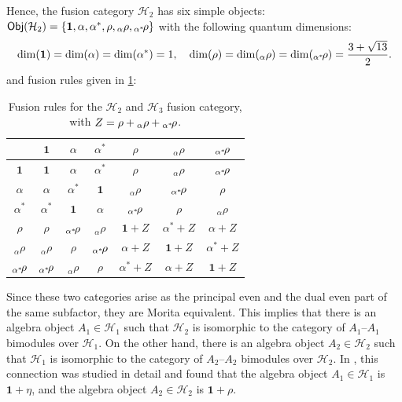 {{		Hence, the fusion category $\mathcal{H}_2$ has six simple objects: $\mathsf{Obj}(\mathcal{H}_2)=\{\mathbf{1},\alpha,\alpha^*,\rho,{}_\alpha\rho,{}_{\alpha^*}\!\rho\}$ with the following quantum dimensions:
		\begin{align}
		\dim(\mathbf{1})=\dim(\alpha)=\dim(\alpha^*)=1,\hspace{10pt}\dim(\rho)=\dim({}_\alpha\rho)=\dim({}_{\alpha^*}\!\rho)=\frac{3+\sqrt{13}}{2}.
		\end{align}
		and fusion rules given in \cref{tab:fusionH2}:
		{{\setlength{\tabcolsep}{10pt}
			\renewcommand{\arraystretch}{1.25}
			\begin{table}[H]
				\centering
				\begin{tabular}{c||c|c|c|c|c|c}
					& $\mathbf{1}$ & $\alpha$ & $\alpha^*$ & $\rho$ & ${}_\alpha
					\rho$ & ${}_{\alpha^*}\!\rho$ \\ \hline \hline
					$\mathbf{1}$ & $\mathbf{1}$ & $\alpha$ & $\alpha^*$ & $\rho$ & ${}_\alpha \rho$ & ${}_{\alpha^*}\!\rho$ \\ \hline
					$\alpha$ & $\alpha$ & $\alpha^*$ & $\mathbf{1}$ & ${}_\alpha \rho$ & ${}_{\alpha^*}\!\rho$ & $\rho$ \\ \hline
					$\alpha^*$ & $\alpha^*$ & $\mathbf{1}$ & $\alpha$ & ${}_{\alpha^*}\!\rho$ & $\rho$ & ${}_\alpha \rho$ \\ \hline
					$\rho$ & $\rho$ & ${}_{\alpha^*}\!\rho$ & ${}_\alpha \rho$ & $\mathbf{1}+ Z$ & $\alpha^*+Z$ & $\alpha+Z$ \\ \hline
					${}_\alpha\rho$ & ${}_\alpha\rho$ & $\rho$ & ${}_{\alpha^*}\!\rho$ & $\alpha+Z$ & $\mathbf{1}+Z$ & $\alpha^*+Z$ \\ \hline
					${}_{\alpha^*}\!\rho$ & ${}_{\alpha^*}\!\rho$ & ${}_\alpha\rho$ & $\rho$ & $\alpha^*+Z$ & $\alpha+Z$ & $\mathbf{1}+Z$\vspace{8pt}
				\end{tabular}
				\caption{\small \label{tab:fusionH2}Fusion rules for the $\mathcal{H}_2$ and $\mathcal{H}_3$ fusion category, with $Z=\rho+{}_\alpha\rho+{}_{\alpha^*}\!\rho$.}
			\end{table}}
			
			Since these two categories arise as the principal even and the dual even part of the same subfactor, they are Morita equivalent. This implies that there is an algebra object $A_1\in\mathcal{H}_1$ such that $\mathcal{H}_2$ is isomorphic to the category of $A_1$--$A_1$ bimodules over $\mathcal{H}_1$. On the other hand, there is an algebra object $A_2\in\mathcal{H}_2$ such that $\mathcal{H}_1$ is isomorphic to the category of $A_2$--$A_2$ bimodules over $\mathcal{H}_2$. In \cite{grossman_quantum_2012}, this connection was studied in detail and found that the algebra object $A_1\in\mathcal{H}_1$ is $\mathbf{1}+\eta$, and the algebra object $A_2\in\mathcal{H}_2$ is $\mathbf{1}+\rho$.
			
}}}
